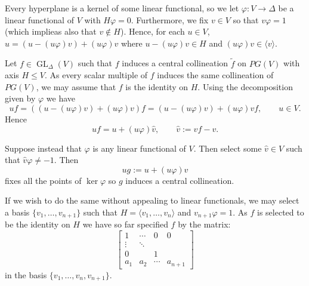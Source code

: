 \documentclass[12pt]{article}
\DeclareMathOperator{\GL}{GL}
\begin{document}
Every hyperplane is a kernel of some linear functional, so we let $\varphi:V\to \Delta$ be a linear functional of $V$ with $H\varphi=0$.  Furthermore, we fix $v\in V$ so that
$v\varphi=1$ (which implieas also that $v\notin H$).     Hence, for each $u\in V$, 
$u=(u-(u\varphi)v)+(u\varphi)v$ where $u-(u\varphi) v\in H$ and $(u\varphi)v\in\langle v\rangle$.


Let $f\in \GL_{\Delta}(V)$ such that $f$ induces a central collineation $\tilde{f}$ on $PG(V)$ with
axis $H\leq V$.   As every scalar multiple of $f$ induces the same collineation of $PG(V)$, we 
may assume that $f$ is the identity on $H$.  Using the decomposition given by $\varphi$ we have
\[uf = ((u-(u\varphi)v)+(u\varphi)v)f = (u-(u\varphi)v) + (u\varphi) vf,\qquad u\in V.\]
Hence
\[uf = u + (u\varphi)\hat{v},\qquad \hat{v}:=vf-v.\]

Suppose instead that $\varphi$ is any linear functional of $V$.  Then select some $\hat{v}\in V$
such that $\hat{v}\varphi\neq -1$.  Then 
\[ug := u+(u\varphi)\hat{v}\]
fixes all the points of $\ker \varphi$ so $g$ induces a central collineation.

If we wish to do the same without appealing to linear functionals, we may select a basis 
$\{v_1,\dots, v_{n+1}\}$ such that $H=\langle v_1,\dots, v_n\rangle$ and 
$v_{n+1}\varphi=1$.  As $f$ is selected to be the identity on $H$ we have so far specified
$f$ by the matrix:
\[
\begin{bmatrix}
1 & \cdots & 0 & 0 \\
\vdots  & \ddots & & \\
0 & & 1 & \\
a_1 & a_2 &\cdots  & a_{n+1}
\end{bmatrix}
\]
in the basis $\{v_1,\dots, v_n,v_{n+1}\}$. 

\end{document}
